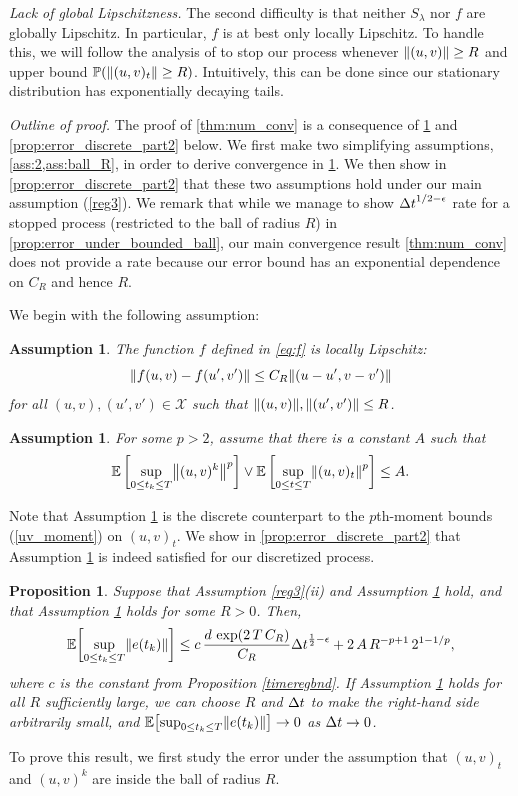 \documentclass[11pt, twoside]{report}
\newtheorem{proposition}[theorem]{Proposition}
\newtheorem{assumption}[theorem]{Assumption}
\begin{document}
\textit{Lack of global Lipschitzness.}
The second difficulty is that  neither $S_\lambda$ nor $f$ are globally Lipschitz.  In particular, $f$ is at best only locally Lipschitz. To handle this, we will follow the analysis of \cite{higham2002strong} to stop our process whenever $\left\lVert(u,v)\right\rVert\geq R$ and upper bound $\mathbb{P}(\left\lVert(u,v)_t\right\rVert\geq R)$. Intuitively, this can be done since our stationary distribution has exponentially decaying tails. 

\textit{Outline of proof.}
The proof of \ref{thm:num_conv}  is a consequence of \ref{prop:error_discrete} and \ref{prop:error_discrete_part2} below. We first make two simplifying assumptions, \ref{ass:2,ass:ball_R}, in order to derive convergence in \ref{prop:error_discrete}. We then show in \ref{prop:error_discrete_part2} that these two assumptions hold under our main assumption (\ref{reg3}). 
 We remark that while we manage to show ${\Delta t}^{1/2-\epsilon}$ rate for a stopped process (restricted to the ball of radius $R$) in \ref{prop:error_under_bounded_ball}, our main convergence result \ref{thm:num_conv} does not provide a rate because our error bound has an exponential dependence on $C_R$ and hence $R$.

 We begin with the following assumption:
\begin{assumption}\label{ass:ball_R}
The function $f$ defined in \eqref{eq:f} is locally Lipschitz:
$$
\norm{f(u,v) - f(u',v')} \leq  C_R \norm{(u-u', v-v')}
$$
for all $(u,v),(u',v')\in \mathcal X$ such that $\norm{(u,v)}, \norm{(u',v')} \leq R$. 
\end{assumption}
%
\begin{assumption}\label{ass:2}   
For some $p>2$, assume that there is a constant $A$ such that
$$
\EE\left[\sup_{0\le t_k\leq T} \norm{(u,v)^k}^{p}\right] \vee \EE\left[\sup_{0\le t\leq T} \norm{(u,v)_t}^{p}\right] \leq A.
$$
\end{assumption}
Note that Assumption \ref{ass:2} is the discrete counterpart to the $p$th-moment bounds (\ref{uv_moment}) on $(u,v)_t$. We  show in \ref{prop:error_discrete_part2} that Assumption \ref{ass:2} is indeed satisfied for our discretized process.

\begin{proposition}\label{prop:error_discrete}
    Suppose that Assumption \ref{reg3}(ii) and Assumption \ref{ass:2} hold, and that Assumption \ref{ass:ball_R} holds for some $R>0$. Then, 
      $$
\EE\bp{ \sup_{0\leq t_k\leq T} \norm{e(t_k)} }\leq  c\,\frac{d \,\exp\pa{2\,T\, C_R}}{C_R}  \deltat^{\frac12-\epsilon} +  2\,A\, R^{-p+1}\, 2^{1-1/p},
$$
where $c$ is the constant from Proposition \ref{timeregbnd}.  If Assumption \ref{ass:ball_R} holds for all $R$ sufficiently large,  we can choose $R$ and ${\Delta t}$ to make the right-hand side arbitrarily small, and $\EE\bp{ \sup_{0\leq t_k\leq T} \norm{e(t_k)} }\to 0$ as ${\Delta t}\to 0$.
\end{proposition}
To prove this result, we first study the error under the assumption that $(u,v)_t$ and $(u,v)^k$ are inside the ball of radius $R$.
\end{document}
